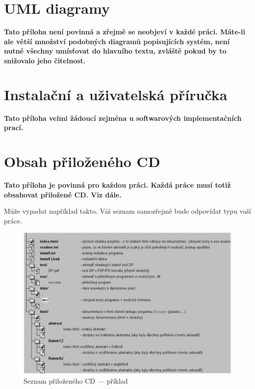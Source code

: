 \documentclass[11pt,twoside,a4paper]{book}
\begin{document}
\chapter{UML diagramy}
\textbf{\large Tato příloha není povinná a zřejmě se neobjeví v každé práci. Máte-li ale větší množství podobných diagramů popisujících systém, není nutné všechny umísťovat do hlavního textu, zvláště pokud by to snižovalo jeho čitelnost.}

\chapter{Instalační a uživatelská příručka}
\textbf{\large Tato příloha velmi žádoucí zejména u softwarových implementačních prací.}

\chapter{Obsah přiloženého CD}
\textbf{\large Tato příloha je povinná pro každou práci. Každá práce musí totiž obsahovat přiložené CD. Viz dále.}

Může vypadat například takto. Váš seznam samozřejmě bude odpovídat typu vaší práce. 

\begin{figure}[H]
\begin{center}
\includegraphics[width=14cm]{figures/seznamcd}
\caption{Seznam přiloženého CD --- příklad}
\label{fig:seznamcd}
\end{center}
\end{figure}
\end{document}
